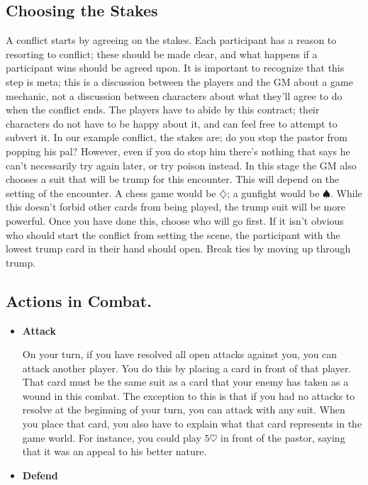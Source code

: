 \documentclass[]{article}
\begin{document}
{	\subsection*{Choosing the Stakes}
		A conflict starts by agreeing on the stakes. Each participant has a reason to resorting to conflict; these should be made clear, and what happens if a participant wins should be agreed upon. It is important to recognize that this step is meta; this is a discussion between the players and the GM about a game mechanic, not a discussion between characters about what they'll agree to do when the conflict ends. The players have to abide by this contract; their characters do not have to be happy about it, and can feel free to attempt to subvert it. In our example conflict, the stakes are; do you stop the pastor from popping his pal? However, even if you do stop him there's nothing that says he can't necessarily try again later, or try poison instead. In this stage the GM also chooses a suit that will be trump for this encounter. This will depend on the setting of the encounter. A chess game would be $\diamondsuit$; a gunfight would be $\spadesuit$. While this doesn't forbid other cards from being played, the trump suit will be more powerful. Once you have done this, choose who will go first. If it isn't obvious who should start the conflict from setting the scene, the participant with the lowest trump card in their hand should open. Break ties by moving up through trump.
		
	\subsection*{Actions in Combat.}
		\begin{itemize}
			\item \textbf{Attack}
			
			On your turn, if you have resolved all open attacks against you, you can attack another player. You do this by placing a card in front of that player. That card must be the same suit as a card that your enemy has taken as a wound in this combat. The exception to this is that if you had no attacks to resolve at the beginning of your turn, you can attack with any suit. When you place that card, you also have to explain what that card represents in the game world. For instance, you could play $5\heartsuit$ in front of the pastor, saying that it was an appeal to his better nature.
			
			\item \textbf{Defend}
			

\end{itemize}}
\end{document}
